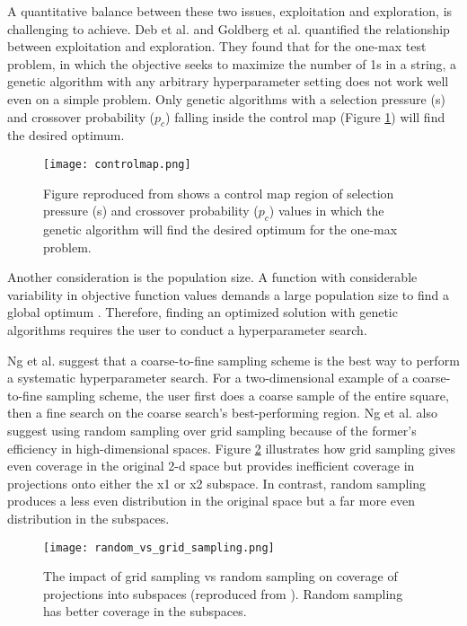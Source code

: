 A quantitative balance between these two issues, exploitation and exploration, 
is challenging to achieve. 
Deb et al. \cite{deb_multi-objective_2001} and Goldberg et al. 
\cite{goldberg_toward_1993} quantified the relationship between exploitation 
and exploration. 
They found that for the one-max test problem, in which the objective seeks to 
maximize the number of 1s in a string, a genetic algorithm with any arbitrary 
hyperparameter setting does not work well even on a simple problem. 
Only genetic algorithms with a selection pressure (s) and crossover probability ($p_c$) 
falling inside the control map (Figure \ref{fig:controlmap}) will find the desired 
optimum.  
\begin{figure}[]
    \centering
    \texttt{[image: controlmap.png]} 
    \caption{Figure reproduced from \cite{goldberg_toward_1993,deb_multi-objective_2001}
    shows a control map region of selection pressure (s) and crossover probability ($p_c$)
    values in which the genetic algorithm will find the desired optimum for the 
    one-max problem.}
    \label{fig:controlmap}
\end{figure}
Another consideration is the population size. 
A function with considerable variability in objective function values demands 
a large population size to find a global optimum \cite{deb_multi-objective_2001}. 
Therefore, finding an optimized solution with genetic algorithms requires the user 
to conduct a hyperparameter search. 

Ng et al. \cite{ng_improving_2021} suggest that a coarse-to-fine sampling scheme 
is the best way to perform a systematic hyperparameter search.  
For a two-dimensional example of a coarse-to-fine sampling scheme, the user 
first does a coarse sample of the entire square, then a fine search on the 
coarse search's best-performing region. 
Ng et al. also suggest using random sampling over grid sampling because of the 
former's efficiency in high-dimensional spaces. 
Figure \ref{fig:random_vs_grid_sampling} illustrates how grid sampling gives 
even coverage in the original 2-d space but provides inefficient coverage in 
projections onto either the x1 or x2 subspace.  
In contrast, random sampling produces a less even distribution in the original 
space but a far more even distribution in the subspaces.
\begin{figure}[]
    \centering
    \texttt{[image: random\_vs\_grid\_sampling.png]} 
    \caption{The impact of grid sampling vs random sampling on coverage of projections 
    into subspaces (reproduced from \cite{jordan_hyperparameter_2017}). 
    Random sampling has better coverage in the subspaces.}
    \label{fig:random_vs_grid_sampling}
\end{figure}

